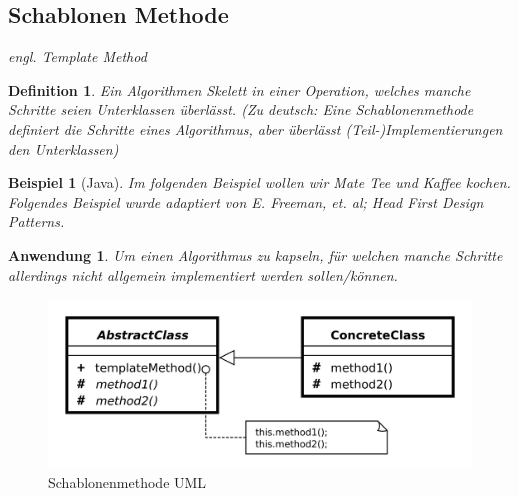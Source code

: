 \documentclass[a4paper]{article}
\theoremstyle{break}
\newtheorem{defi}{Definition}[section]
\newtheorem{ex}{Beispiel}[section]
\newtheorem{why}{Anwendung}[section]
\begin{document}
\newpage
\subsection{Schablonen Methode}

\textit{engl. Template Method}

\begin{defi}
	Ein Algorithmen Skelett in einer Operation, welches manche Schritte seien Unterklassen überlässt. (Zu deutsch: Eine Schablonenmethode definiert die Schritte eines Algorithmus, aber überlässt (Teil-)Implementierungen den Unterklassen)
\end{defi}

\begin{ex}[Java]
	Im folgenden Beispiel wollen wir Mate Tee und Kaffee kochen. Folgendes Beispiel wurde adaptiert von E. Freeman, et. al; Head First Design Patterns.
	
	
	
	
	
	
\end{ex}

\begin{why}
		Um einen Algorithmus zu kapseln, für welchen manche Schritte allerdings nicht allgemein implementiert werden sollen/können.	
\end{why}
\begin{figure}[H]
	\centering
	\includegraphics[width=\textwidth]{../diagrams/uml/TemplateMethodPattern.png}
	\caption{Schablonenmethode UML}
\end{figure}
\end{document}
